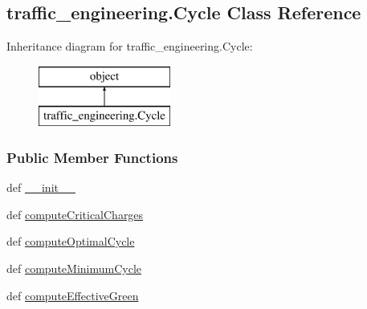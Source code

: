 \hypertarget{classtraffic__engineering_1_1Cycle}{\subsection{traffic\-\_\-engineering.\-Cycle Class Reference}
\label{classtraffic__engineering_1_1Cycle}
}
Inheritance diagram for traffic\-\_\-engineering.\-Cycle\-:\begin{figure}[H]
\begin{center}
\leavevmode
\includegraphics[height=2.000000cm]{classtraffic__engineering_1_1Cycle}
\end{center}
\end{figure}
\subsubsection*{Public Member Functions}
\begin{DoxyCompactItemize}
\item 
def \hyperlink{classtraffic__engineering_1_1Cycle_a0eeb478326b8bf89c5ee21ad358b9a1d}{\-\_\-\-\_\-init\-\_\-\-\_\-}
\item 
def \hyperlink{classtraffic__engineering_1_1Cycle_aa4d18da4fda77fcaf9e00dda517a9bcd}{compute\-Critical\-Charges}
\item 
def \hyperlink{classtraffic__engineering_1_1Cycle_a3dde9ca514dd8a334e124cf786d725a3}{compute\-Optimal\-Cycle}
\item 
def \hyperlink{classtraffic__engineering_1_1Cycle_a9c06b3bca0b5ae4d9679423fa8258d01}{compute\-Minimum\-Cycle}
\item 
def \hyperlink{classtraffic__engineering_1_1Cycle_ae139a083fc6f3fb86939056785d12183}{compute\-Effective\-Green}
\end{DoxyCompactItemize}
